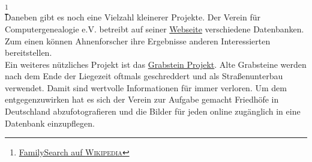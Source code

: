 \footnote{\href{https://en.wikipedia.org/wiki/FamilySearch}{FamilySearch auf \textsc{Wikipedia}}}\\


Daneben gibt es noch eine Vielzahl kleinerer Projekte. Der Verein für Computergenealogie e.V. betreibt auf seiner \href{http://compgen.de/}{Webseite} verschiedene Datenbanken. Zum einen können Ahnenforscher ihre Ergebnisse anderen Interessierten bereitstellen. \\

Ein weiteres nützliches Projekt ist das \href{http://grabsteine.genealogy.net/}{Grabstein Projekt}. Alte Grabsteine werden nach dem Ende der Liegezeit oftmals geschreddert und als Straßenunterbau verwendet. Damit sind wertvolle Informationen für immer verloren. Um dem entgegenzuwirken hat es sich der Verein zur Aufgabe gemacht Friedhöfe in Deutschland abzufotografieren und die Bilder für jeden online zugänglich in eine Datenbank einzupflegen. 



